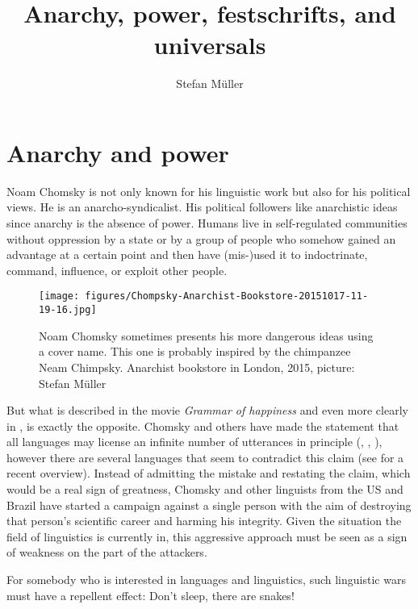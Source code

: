 \documentclass[output=paper,colorlinks,citecolor=brown]{langscibook}
\title{Anarchy, power, festschrifts, and universals}
\author{Stefan Müller\orcid{0000-0003-4413-5313}\affiliation{Humboldt-Universität zu Berlin}}
\begin{document}
\maketitle

\section{Anarchy and power} 

Noam Chomsky is not only known for his linguistic work but also for his political views. He is an
anarcho-syndicalist. His political followers like anarchistic ideas since anarchy is the absence of
power. Humans live in self-regulated communities without oppression by a state or by a group of
people who somehow gained an advantage at a certain point and then have (mis-)used it to indoctrinate, command, influence, or
exploit other people.

\begin{figure}
\texttt{[image: figures/Chompsky-Anarchist-Bookstore-20151017-11-19-16.jpg]}
\caption{Noam Chomsky sometimes presents his more dangerous ideas using a cover name. This one is
  probably inspired by the chimpanzee Neam Chimpsky. Anarchist
  bookstore in London, 2015, picture: Stefan Müller}
\end{figure}

But what is described in the movie \emph{Grammar of happiness} \citep{OW2012a} and even more clearly
in , is exactly the opposite. Chomsky and others have made the statement that all languages may license an infinite number of utterances in principle (\citealt*[]{HCF2002a}, \citealt[]{EH2005a-u}, \citealt*[]{HNG2005a}), however there are several languages that seem to contradict this claim (see
 for a recent overview). Instead of
admitting the mistake and restating the claim, which would be a real sign of greatness, Chomsky and
other linguists from the US and Brazil have started a campaign against a single person with the aim of destroying that
person's scientific career and harming his integrity. Given the situation the field of linguistics is currently in,
this aggressive approach must be seen as a sign of weakness on the part of the attackers.

For somebody who is interested in languages and linguistics, such linguistic wars \citep{Harris93a}
must have a repellent effect: Don't sleep, there are snakes!    
\end{document}
